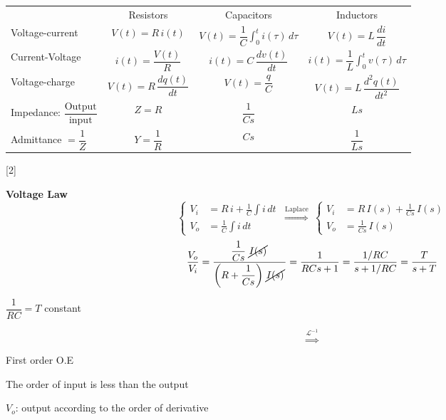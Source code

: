 \documentclass[11pt,a4paper]{article}
\begin{document}
\begin{center}
\small
\setlength{\tabcolsep}{5pt}
\renewcommand{\arraystretch}{2.2}
\begin{tabular}{@{}l c c c@{}}
 & Resistors & Capacitors & Inductors \\
Voltage-current & $V(t)=R\,i(t)$ & $V(t)=\dfrac{1}{C}\displaystyle\int_{0}^{t} i(\tau)\,d\tau$ & $V(t)=L\,\dfrac{di}{dt}$ \\
Current-Voltage & $i(t)=\dfrac{V(t)}{R}$ & $i(t)=C\,\dfrac{dv(t)}{dt}$ & $i(t)=\dfrac{1}{L}\displaystyle\int_{0}^{t} v(\tau)\,d\tau$ \\
Voltage-charge & $V(t)=R\,\dfrac{dq(t)}{dt}$ & $V(t)=\dfrac{q}{C}$ & $V(t)=L\,\dfrac{d^{2}q(t)}{dt^{2}}$ \\
Impedance: $\dfrac{\text{Output}}{\text{input}}$ & $Z=R$ & $\dfrac{1}{Cs}$ & $Ls$ \\
Admittance $=\dfrac{1}{Z}$ & $Y=\dfrac{1}{R}$ & $Cs$ & $\dfrac{1}{Ls}$ \\
\end{tabular}
\end{center}

\newcommand{\iptal}[1]{\tikz[baseline=(iptaln.base)]{\node[inner sep=1pt](iptaln){$#1$};\draw[line width=0.7pt](iptaln.south west)--(iptaln.north east);}}
[2]

\noindent\textbf{Voltage Law}
\[
\left\{\begin{aligned}
V_i &= R\,i + \frac{1}{C}\int i\,dt\\
V_o &= \frac{1}{C}\int i\,dt
\end{aligned}\right.
\ \overset{\text{Laplace}}{\Longrightarrow}\
\left\{\begin{aligned}
V_i &= R\,I(s) + \frac{1}{Cs}\,I(s)\\
V_o &= \frac{1}{Cs}\,I(s)
\end{aligned}\right.
\]
\[
\frac{V_o}{V_i}=\frac{\dfrac{1}{Cs}\,\iptal{I(s)}}{\left(R+\dfrac{1}{Cs}\right)\iptal{I(s)}}
=\frac{1}{RCs+1}=\frac{1/RC}{s+1/RC}=\frac{T}{s+T}
\]
\begin{center}
$\dfrac{1}{RC}=T$ constant
\end{center}
\[\overset{\mathcal{L}^{-1}}{\Longrightarrow}\]

First order O.E

The order of input is less than the output

$V_o$: output according to the order of derivative
\end{document}
